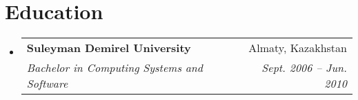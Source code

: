 \documentclass[letterpaper,11pt]{article}
\makeatletter
\newcommand{\resumeSubheading}[4]{
  \vspace{-1pt}\item
    \begin{tabular*}{0.97\textwidth}[t]{l@{\extracolsep{\fill}}r}
      \textbf{#1} & #2 \\
      \textit{\small#3} & \textit{\small #4} \\
    \end{tabular*}\vspace{-5pt}
}
\newcommand{\resumeSubHeadingListStart}{\begin{itemize}[leftmargin=*]}
\newcommand{\resumeSubHeadingListEnd}{\end{itemize}}
\makeatother
\begin{document}

\section{Education}
  \resumeSubHeadingListStart
    \resumeSubheading
      {Suleyman Demirel University}{Almaty, Kazakhstan}
      {Bachelor in Computing Systems and Software}{Sept. 2006 -- Jun. 2010}
  \resumeSubHeadingListEnd
\end{document}
